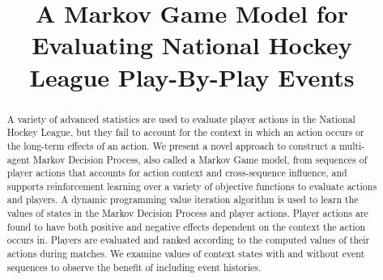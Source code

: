 \documentclass[]{article}
\title{A Markov Game Model for Evaluating National Hockey League Play-By-Play Events}
\author{} %
\begin{document}
\maketitle

\begin{abstract}
A variety of advanced statistics are used to evaluate player actions in the National Hockey League, but they fail to account for the context in which an action occurs or the long-term effects of an action. We present a novel approach to construct a multi-agent Markov Decision Process, also called a Markov Game model, from sequences of player actions that accounts for action context and cross-sequence influence, and supports reinforcement learning over a variety of objective functions to evaluate actions and players. A dynamic programming value iteration algorithm is used to learn the values of states in the Markov Decision Process and player actions. Player actions are found to have both positive and negative effects dependent on the context the action occurs in. Players are evaluated and ranked according to the computed values of their actions during matches. We examine values of context states with and without event sequences to observe the benefit of including event histories.
\end{abstract}




\end{document}
